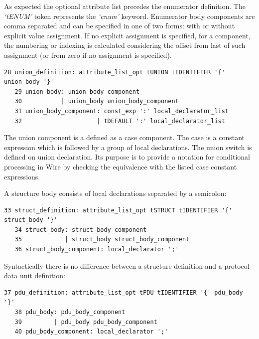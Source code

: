 \documentclass[times, utf8, diplomski]{fer}
\begin{document}
As expected the optional attribute list precedes the enumerator definition. The 
\emph{`tENUM'} token represents the \emph{`enum'} keyword. Enumerator body 
components are comma separated and can be specified in one of two forms: 
with or without explicit value assignment. If no explicit assignment  is specified, 
for a component, the numbering or indexing is calculated considering the offset 
from last of such assignment (or from zero if no assignment is specified).
\lstset{language=IDL}
\lstset{basicstyle=\tiny}
\begin{lstlisting}[frame=tb]
   28 union_definition: attribute_list_opt tUNION tIDENTIFIER '{' union_body '}'
   29 union_body: union_body_component
   30           | union_body union_body_component
   31 union_body_component: const_exp ':' local_declarator_list
   32                     | tDEFAULT ':' local_declarator_list 
\end{lstlisting}

The union component is a defined as a case component. The case is a constant 
expression which is followed by a group of local declarations. The union switch 
is defined on union declaration. Its purpose is to provide a notation for 
conditional processing in Wire by checking the equivalence with the listed case 
constant expressions.

A structure body consists of local declarations separated by a semicolon:
\lstset{language=IDL}
\lstset{basicstyle=\tiny}
\begin{lstlisting}[frame=tb]
   33 struct_definition: attribute_list_opt tSTRUCT tIDENTIFIER '{' struct_body '}'
   34 struct_body: struct_body_component
   35            | struct_body struct_body_component
   36 struct_body_component: local_declarator ';'
\end{lstlisting}

Syntactically there is no difference between a structure definition and a protocol 
data unit definition:
\lstset{language=IDL}
\lstset{basicstyle=\tiny}
\begin{lstlisting}[frame=tb]
   37 pdu_definition: attribute_list_opt tPDU tIDENTIFIER '{' pdu_body '}'
   38 pdu_body: pdu_body_component
   39         | pdu_body pdu_body_component
   40 pdu_body_component: local_declarator ';'
\end{lstlisting}
\end{document}

